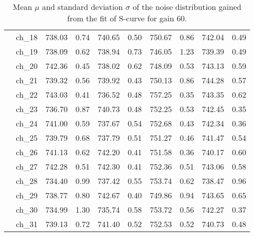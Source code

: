 \begin{table}[H]
{\begin{tabular}{|c|c|c|c|c|c|c|c|c|c|}
  &ch\_18 & 738.03 & 0.74 & 740.65 & 0.50 & 750.67 & 0.86 & 742.04 & 0.49 \\
  &ch\_19 & 738.09 & 0.62 & 738.94 & 0.73 & 746.05 & 1.23 & 739.39 & 0.49 \\
  &ch\_20 & 742.36 & 0.45 & 738.02 & 0.62 & 748.09 & 0.53 & 743.13 & 0.59 \\
  &ch\_21 & 739.32 & 0.56 & 739.92 & 0.43 & 750.13 & 0.86 & 744.28 & 0.57 \\
  &ch\_22 & 743.03 & 0.41 & 736.52 & 0.48 & 757.25 & 0.35 & 743.35 & 0.62 \\
  &ch\_23 & 736.70 & 0.87 & 740.73 & 0.48 & 752.25 & 0.53 & 742.45 & 0.35 \\
  &ch\_24 & 741.00 & 0.59 & 737.67 & 0.54 & 752.68 & 0.43 & 742.34 & 0.36 \\
  &ch\_25 & 739.79 & 0.68 & 737.79 & 0.51 & 751.27 & 0.46 & 741.47 & 0.54 \\
  &ch\_26 & 741.13 & 0.62 & 742.20 & 0.41 & 751.58 & 0.36 & 740.17 & 0.60 \\
  &ch\_27 & 742.28 & 0.51 & 742.30 & 0.41 & 752.36 & 0.51 & 743.06 & 0.58 \\
  &ch\_28 & 734.40 & 0.99 & 737.42 & 0.55 & 753.74 & 0.62 & 738.47 & 0.96 \\
  &ch\_29 & 738.77 & 0.80 & 742.67 & 0.40 & 749.86 & 0.94 & 743.65 & 0.65 \\
  &ch\_30 & 734.99 & 1.30 & 735.74 & 0.58 & 753.72 & 0.56 & 742.27 & 0.37 \\
  &ch\_31 & 739.13 & 0.72 & 741.40 & 0.52 & 752.53 & 0.52 & 740.73 & 0.48 \\
    
    \hline
     
    \end{tabular}
    }
    \caption{Mean $\mu$ and standard deviation $\sigma$ of the noise distribution gained from the fit of S-curve for gain 60.}
    \label{tab:noise_parameter_1}
\end{table}

